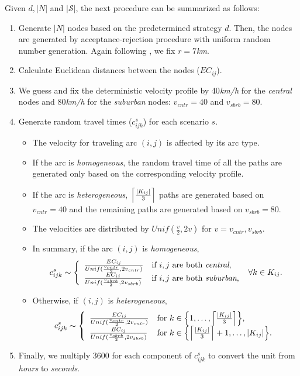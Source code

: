 Given $d,|N|$ and $|\mathcal{S}|$, the next procedure can be summarized as follows:
\begin{enumerate}
	\item Generate $|N|$ nodes based on the predetermined strategy $d$. Then, the nodes are generated by acceptance-rejection procedure with uniform random number generation. Again following \cite{journal:TPP2017}, we fix $r=7$\textit{km}. 
	\item Calculate Euclidean distances between the nodes ($EC_{ij}$).
	\item We guess and fix the deterministic velocity profile by 40\textit{km/h} for the \textit{central} nodes and 80\textit{km/h} for the \textit{suburban} nodes: $v_{cntr}=40$ and $v_{sbrb}=80$.
	\item Generate random travel times ($c_{ijk}^{s}$) for each scenario $s$.
	\begin{itemize}
		\item The velocity for traveling arc $(i,j)$ is affected by its arc type.
		\item If the arc is \textit{homogeneous}, the random travel time of all the paths are generated only based on the corresponding velocity profile.
		\item If the arc is \textit{heterogeneous}, $\ceil*{\frac{|K_{ij}|}{3}}$ paths are generated based on $v_{cntr}=40$ and the remaining paths are generated based on $v_{sbrb}=80$. 
		\item The velocities are distributed by $Unif(\frac{v}{2},2v)$ for $v=v_{cntr},v_{sbrb}$.
		\item In summary, if the arc $(i,j)$ is \textit{homogeneous}, 
		\begin{align*}
		c_{ijk}^{s}\sim\left\{ \begin{array}{ll} \frac{EC_{ij}}{Unif(\frac{v_{cntr}}{2},2v_{cntr})} & \textrm{if $i,j$ are both \textit{central},} \\
		\frac{EC_{ij}}{Unif(\frac{v_{sbrb}}{2},2v_{sbrb})} & \textrm{if $i,j$ are both \textit{suburban},}	\end{array} \right.\ \forall k\in K_{ij}.
		\end{align*}
		\item Otherwise, if $(i,j)$ is \textit{heterogeneous},
		\begin{align*}
		c_{ijk}^{s}\sim\left\{ \begin{array}{ll} \frac{EC_{ij}}{Unif(\frac{v_{cntr}}{2},2v_{cntr})} & \textrm{for $k\in\left\{1,\ldots,\ceil*{\frac{|K_{ij}|}{3}}\right\}$,} \\
		\frac{EC_{ij}}{Unif(\frac{v_{sbrb}}{2},2v_{sbrb})} & \textrm{for $k\in\left\{\ceil*{\frac{|K_{ij}|}{3}}+1,\ldots,|K_{ij}|\right\}$.}	\end{array} \right.
		\end{align*}
	\end{itemize}
	\item Finally, we multiply 3600 for each component of $c_{ijk}^{s}$ to convert the unit from \textit{hours} to \textit{seconds}.
\end{enumerate}

